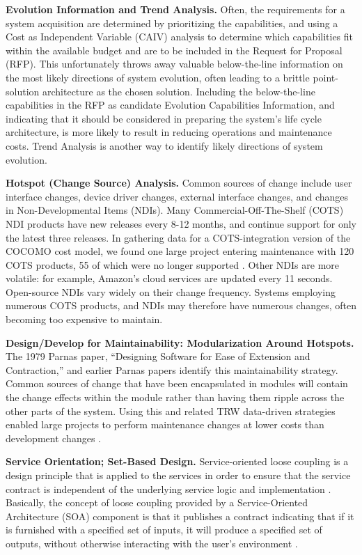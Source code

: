 \textbf{Evolution Information and Trend Analysis.}
Often, the requirements for a system acquisition are determined by prioritizing the capabilities, and using a Cost as Independent Variable (CAIV) analysis to determine which capabilities fit within the available budget and are to be included in the Request for Proposal (RFP).   This unfortunately throws away valuable below-the-line information on the most likely directions of system evolution, often leading to a brittle point-solution architecture as the chosen solution.
Including the below-the-line capabilities in the RFP as candidate Evolution Capabilities Information, and indicating that it should be considered in preparing the system's life cycle architecture, is more likely to result in reducing operations and maintenance costs.
Trend Analysis is another way to identify likely directions of system evolution.

\textbf{Hotspot (Change Source) Analysis.} Common sources of change include user interface changes, device driver changes, external interface changes, and changes in Non-Developmental Items (NDIs).
Many Commercial-Off-The-Shelf (COTS) NDI products have new releases every 8-12 months, and continue support for only the latest three releases.  In gathering data for a COTS-integration version of the COCOMO cost model, we found one large project entering maintenance with 120 COTS products, 55 of which were no longer supported \citep{Abts00cocots:a}.  Other NDIs are more volatile: for example, Amazon's cloud services are updated every 11 seconds.  Open-source NDIs vary widely on their change frequency.  Systems employing numerous COTS products, and NDIs may therefore have numerous changes, often becoming too expensive to maintain.

\textbf{Design/Develop for Maintainability: Modularization Around Hotspots.} The 1979 Parnas paper, ``Designing Software for Ease of Extension and Contraction,'' \citep{parnas1979designing} and earlier Parnas papers identify this maintainability strategy.   Common sources of change that have been encapsulated in modules will contain the change effects within the module rather than having them ripple across the other parts of the system.    Using this and related TRW data-driven strategies enabled large projects to perform maintenance changes at lower costs than development changes \citep{royce1998software}.   

\textbf{Service Orientation; Set-Based Design.} Service-oriented loose coupling is a design principle that is applied to the services in order to ensure that the service contract is independent of the underlying service logic and implementation \citep{sundbo2000innovation}. Basically, the concept of loose coupling provided by a Service-Oriented Architecture (SOA) component is that it publishes a contract indicating that if it is furnished with a specified set of inputs, it will produce a specified set of outputs, without otherwise interacting with the user's environment \citep{boehm2008balancing,borges2004delving}.

